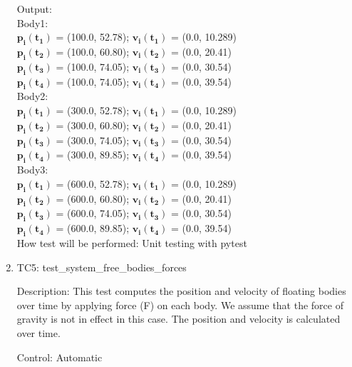 \documentclass[12pt, titlepage]{article}
\begin{document}
\begin{enumerate}
Output:\\
Body1:\\
 $\mathbf{p_i}$$\mathbf{(t_1)}$ = (100.0, 52.78);
 $\mathbf{v_i}$$\mathbf{(t_1)}$ = (0.0, 10.289)\\
 $\mathbf{p_i}$$\mathbf{(t_2)}$ = (100.0, 60.80);
 $\mathbf{v_i}$$\mathbf{(t_2)}$ = (0.0, 20.41)\\
 $\mathbf{p_i}$$\mathbf{(t_3)}$ = (100.0, 74.05);
 $\mathbf{v_i}$$\mathbf{(t_3)}$ = (0.0, 30.54)\\
 $\mathbf{p_i}$$\mathbf{(t_4)}$ = (100.0, 74.05);
 $\mathbf{v_i}$$\mathbf{(t_4)}$ = (0.0, 39.54)\\
 
 Body2:\\
 $\mathbf{p_i}$$\mathbf{(t_1)}$ = (300.0, 52.78);
 $\mathbf{v_i}$$\mathbf{(t_1)}$ = (0.0, 10.289)\\
 $\mathbf{p_i}$$\mathbf{(t_2)}$ = (300.0, 60.80);
 $\mathbf{v_i}$$\mathbf{(t_2)}$ = (0.0, 20.41)\\
 $\mathbf{p_i}$$\mathbf{(t_3)}$ = (300.0, 74.05);
 $\mathbf{v_i}$$\mathbf{(t_3)}$ = (0.0, 30.54)\\
 $\mathbf{p_i}$$\mathbf{(t_4)}$ = (300.0, 89.85);
 $\mathbf{v_i}$$\mathbf{(t_4)}$ = (0.0, 39.54)\\
 
 Body3:\\
 $\mathbf{p_i}$$\mathbf{(t_1)}$ = (600.0, 52.78);
 $\mathbf{v_i}$$\mathbf{(t_1)}$ = (0.0, 10.289)\\
 $\mathbf{p_i}$$\mathbf{(t_2)}$ = (600.0, 60.80);
 $\mathbf{v_i}$$\mathbf{(t_2)}$ = (0.0, 20.41)\\
 $\mathbf{p_i}$$\mathbf{(t_3)}$ = (600.0, 74.05);
 $\mathbf{v_i}$$\mathbf{(t_3)}$ = (0.0, 30.54)\\
 $\mathbf{p_i}$$\mathbf{(t_4)}$ = (600.0, 89.85);
 $\mathbf{v_i}$$\mathbf{(t_4)}$ = (0.0, 39.54)\\

How test will be performed: Unit testing with pytest

\item{TC5: test\_system\_free\_bodies\_forces\\}

Description: This test computes the position and velocity of floating bodies over time by applying force (F) on each body. We assume that the force of gravity is not in effect in this case. The position and velocity is calculated over time. 

Control: Automatic


\end{enumerate}
\end{document}
